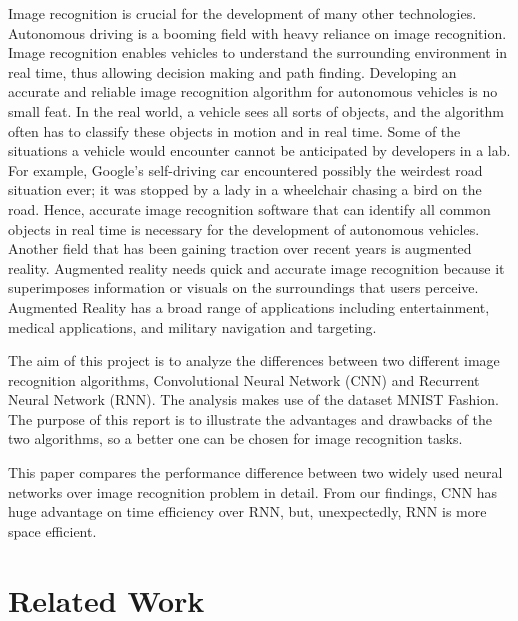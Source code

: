 \documentclass[letterpaper]{article} %
\begin{document}
	Image recognition is crucial for the development of many other technologies. Autonomous driving is a booming field with heavy reliance on image recognition. Image recognition enables vehicles to understand the surrounding environment in real time, thus allowing decision making and path finding. Developing an accurate and reliable image recognition algorithm for autonomous vehicles is no small feat. In the real world, a vehicle sees all sorts of objects, and the algorithm often has to classify these objects in motion and in real time. Some of the situations a vehicle would encounter cannot be anticipated by developers in a lab. For example, Google’s self-driving car encountered possibly the weirdest road situation ever; it was stopped by a lady in a wheelchair chasing a bird on the road. \cite{birdchasing2017} Hence, accurate image recognition software that can identify all common objects in real time is necessary for the development of autonomous vehicles. Another field that has been gaining traction over recent years is augmented reality. Augmented reality needs quick and accurate image recognition because it superimposes information or visuals on the surroundings that users perceive. Augmented Reality has a broad range of applications including entertainment, medical applications, and military navigation and targeting. \cite{ronald2006ar}
	
	The aim of this project is to analyze the differences between two different image recognition algorithms, Convolutional Neural Network (CNN) and Recurrent Neural Network (RNN). The analysis makes use of the dataset MNIST Fashion. The purpose of this report is to illustrate the advantages and drawbacks of the two algorithms, so a better one can be chosen for image recognition tasks.
	
	This paper compares the performance difference between two widely used neural networks over image recognition problem in detail. From our findings, CNN has huge advantage on time efficiency over RNN, but, unexpectedly, RNN is more space efficient.
	
	
	\section{Related Work}
	
\end{document}
